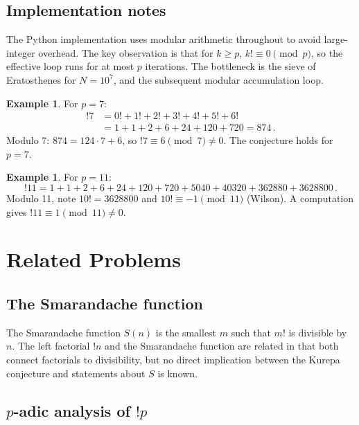 \documentclass[12pt,a4paper]{amsart}
\theoremstyle{definition}
\newtheorem{example}[theorem]{Example}
\begin{document}
\subsection{Implementation notes}

The Python implementation uses modular arithmetic throughout to avoid
large-integer overhead.
The key observation is that for $k \geq p$, $k! \equiv 0 \pmod p$, so
the effective loop runs for at most $p$ iterations.
The bottleneck is the sieve of Eratosthenes for $N = 10^7$, and the
subsequent modular accumulation loop.

\begin{example}
For $p = 7$:
\begin{align*}
  !7 &= 0! + 1! + 2! + 3! + 4! + 5! + 6!\\
     &= 1 + 1 + 2 + 6 + 24 + 120 + 720 = 874\,.
\end{align*}
Modulo 7: $874 = 124 \cdot 7 + 6$, so $!7 \equiv 6 \pmod 7 \neq 0$.
The conjecture holds for $p=7$.
\end{example}

\begin{example}
For $p = 11$:
\[
  !11 = 1 + 1 + 2 + 6 + 24 + 120 + 720 + 5040 + 40320 + 362880 + 3628800\,.
\]
Modulo 11, note $10! = 3628800$ and $10! \equiv -1 \pmod{11}$ (Wilson).
A computation gives $!11 \equiv 1 \pmod{11} \neq 0$.
\end{example}

\section{Related Problems}
\label{sec:related}

\subsection{The Smarandache function}

The Smarandache function $S(n)$ is the smallest $m$ such that $m!$ is
divisible by $n$.
The left factorial $!n$ and the Smarandache function are related in that
both connect factorials to divisibility, but no direct implication between
the Kurepa conjecture and statements about $S$ is known.

\subsection{$p$-adic analysis of $!p$}
\end{document}

